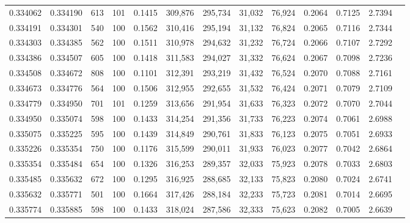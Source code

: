 \begin{tabular}{rrrrrrrrrrrrr}
0.334062 & 0.334190 &   613 & 101 &                                     0.1415 & 309,876 & 295,734 &  31,032 &  76,924 & 0.2064 & 0.7125 & 2.7394 \\
0.334191 & 0.334301 &   540 & 100 &                                     0.1562 & 310,416 & 295,194 &  31,132 &  76,824 & 0.2065 & 0.7116 & 2.7344 \\
0.334303 & 0.334385 &   562 & 100 &                                     0.1511 & 310,978 & 294,632 &  31,232 &  76,724 & 0.2066 & 0.7107 & 2.7292 \\
0.334386 & 0.334507 &   605 & 100 &                                     0.1418 & 311,583 & 294,027 &  31,332 &  76,624 & 0.2067 & 0.7098 & 2.7236 \\
0.334508 & 0.334672 &   808 & 100 &                                     0.1101 & 312,391 & 293,219 &  31,432 &  76,524 & 0.2070 & 0.7088 & 2.7161 \\
0.334673 & 0.334776 &   564 & 100 &                                     0.1506 & 312,955 & 292,655 &  31,532 &  76,424 & 0.2071 & 0.7079 & 2.7109 \\
0.334779 & 0.334950 &   701 & 101 &                                     0.1259 & 313,656 & 291,954 &  31,633 &  76,323 & 0.2072 & 0.7070 & 2.7044 \\
0.334950 & 0.335074 &   598 & 100 &                                     0.1433 & 314,254 & 291,356 &  31,733 &  76,223 & 0.2074 & 0.7061 & 2.6988 \\
0.335075 & 0.335225 &   595 & 100 &                                     0.1439 & 314,849 & 290,761 &  31,833 &  76,123 & 0.2075 & 0.7051 & 2.6933 \\
0.335226 & 0.335354 &   750 & 100 &                                     0.1176 & 315,599 & 290,011 &  31,933 &  76,023 & 0.2077 & 0.7042 & 2.6864 \\
0.335354 & 0.335484 &   654 & 100 &                                     0.1326 & 316,253 & 289,357 &  32,033 &  75,923 & 0.2078 & 0.7033 & 2.6803 \\
0.335485 & 0.335632 &   672 & 100 &                                     0.1295 & 316,925 & 288,685 &  32,133 &  75,823 & 0.2080 & 0.7024 & 2.6741 \\
0.335632 & 0.335771 &   501 & 100 &                                     0.1664 & 317,426 & 288,184 &  32,233 &  75,723 & 0.2081 & 0.7014 & 2.6695 \\
0.335774 & 0.335885 &   598 & 100 &                                     0.1433 & 318,024 & 287,586 &  32,333 &  75,623 & 0.2082 & 0.7005 & 2.6639 \\

\end{tabular}
